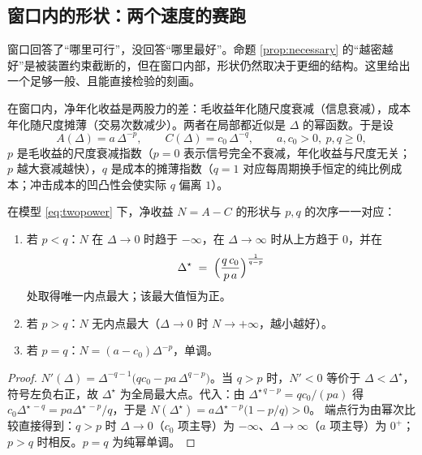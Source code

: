 \subsection{窗口内的形状：两个速度的赛跑}

窗口回答了“哪里可行”，没回答“哪里最好”。命题 \ref{prop:necessary} 的“越密越好”是被装置约束截断的，但在窗口内部，形状仍然取决于更细的结构。这里给出一个足够一般、且能直接检验的刻画。

在窗口内，净年化收益是两股力的差：毛收益年化随尺度衰减（信息衰减），成本年化随尺度摊薄（交易次数减少）。两者在局部都近似是 $\Delta$ 的幂函数。于是设
\begin{equation}
  A(\Delta)=a\,\Delta^{-p},\qquad C(\Delta)=c_0\,\Delta^{-q},\qquad a,c_0>0,\ p,q\ge 0,
  \label{eq:twopower}
\end{equation}
$p$ 是毛收益的尺度衰减指数（$p=0$ 表示信号完全不衰减，年化收益与尺度无关；$p$ 越大衰减越快），$q$ 是成本的摊薄指数（$q=1$ 对应每周期换手恒定的纯比例成本；冲击成本的凹凸性会使实际 $q$ 偏离 $1$）。

\begin{proposition}[双幂形状]\label{prop:twopower}
在模型 \eqref{eq:twopower} 下，净收益 $N=A-C$ 的形状与 $p,q$ 的次序一一对应：
\begin{enumerate}
  \item 若 $p<q$：$N$ 在 $\Delta\to0$ 时趋于 $-\infty$，在 $\Delta\to\infty$ 时从上方趋于 $0$，并在
  \begin{equation}
    \Delta^\star \;=\; \Bigl(\frac{q\,c_0}{p\,a}\Bigr)^{\frac{1}{q-p}}
    \label{eq:deltastar}
  \end{equation}
  处取得唯一内点最大；该最大值恒为正。
  \item 若 $p>q$：$N$ 无内点最大（$\Delta\to0$ 时 $N\to+\infty$，越小越好）。
  \item 若 $p=q$：$N=(a-c_0)\Delta^{-p}$，单调。
\end{enumerate}
\end{proposition}

\begin{proof}
$N'(\Delta)=\Delta^{-q-1}\bigl(qc_0-pa\,\Delta^{q-p}\bigr)$。当 $q>p$ 时，$N'<0$ 等价于 $\Delta<\Delta^\star$，符号左负右正，故 $\Delta^\star$ 为全局最大点。代入：由 $\Delta^{\star\,q-p}=qc_0/(pa)$ 得 $c_0\Delta^{\star\,-q}=pa\Delta^{\star\,-p}/q$，于是
$N(\Delta^\star)=a\Delta^{\star\,-p}\bigl(1-p/q\bigr)>0$。
端点行为由幂次比较直接得到：$q>p$ 时 $\Delta\to0$（$c_0$ 项主导）为 $-\infty$、$\Delta\to\infty$（$a$ 项主导）为 $0^+$；$p>q$ 时相反。$p=q$ 为纯幂单调。
\end{proof}

